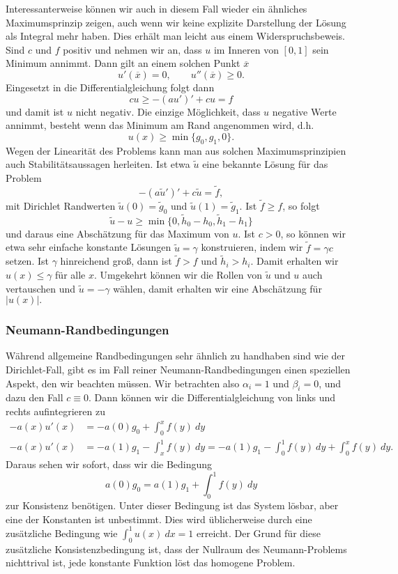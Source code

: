 Interessanterweise k\"onnen wir auch in diesem Fall wieder ein ähnliches Maximumsprinzip zeigen, auch wenn wir keine explizite Darstellung der Lösung als Integral mehr haben. Dies erh\"alt man leicht aus einem Widerspruchsbeweis. Sind $c$ und $f$ positiv und nehmen wir an, dass $u$ im Inneren von $[0,1]$ sein Minimum annimmt. Dann gilt an einem solchen Punkt $\overline{x}$
$$ u'(\overline{x}) = 0, \qquad u''(\overline{x}) \geq 0 . $$
Eingesetzt in die Differentialgleichung folgt dann 
$$ cu \geq -(au')' + cu = f   $$ 
und damit ist $u$ nicht negativ. Die einzige M\"oglichkeit, dass $u$ negative Werte annimmt, besteht wenn das Minimum am Rand angenommen wird, d.h. 
$$ u(x) \geq \min\{g_0,g_1,0\} . $$ 
Wegen der Linearit\"at des Problems kann man aus solchen Maximumsprinzipien auch Stabilitätsaussagen herleiten. Ist etwa $\tilde u$ eine bekannte L\"osung f\"ur das Problem 
$$ -(a \tilde u')' + c \tilde u = \tilde f, $$
mit Dirichlet Randwerten $\tilde u(0) = \tilde{g}_0$ und $\tilde u(1) = \tilde{g}_1$. Ist $\tilde f \geq f$, so folgt 
$$ \tilde u - u \geq \min\{0,\tilde{h}_0 - h_0, \tilde{h}_1 - h_1 \} $$
und daraus eine Absch\"atzung f\"ur das Maximum von $u$. Ist $c > 0$, so k\"onnen wir etwa sehr einfache konstante L\"osungen $\tilde u = \gamma$ konstruieren, indem wir $\tilde f = \gamma c$ setzen. Ist $\gamma$ hinreichend gro{\ss}, dann ist $\tilde f > f$ und $\tilde{h}_i > h_i$. Damit erhalten wir $u(x) \leq \gamma$ f\"ur alle $x$. Umgekehrt k\"onnen wir die Rollen von $\tilde u$ und $u$ auch vertauschen und $\tilde u = -\gamma$ w\"ahlen, damit erhalten wir eine Absch\"atzung f\"ur $\vert u (x) \vert.$ 

\subsubsection*{Neumann-Randbedingungen}

W\"ahrend allgemeine Randbedingungen sehr \"ahnlich zu handhaben sind wie der Dirichlet-Fall, gibt es im Fall reiner Neumann-Randbedingungen einen speziellen Aspekt, den wir beachten m\"ussen. Wir betrachten also $\alpha_i =1$ und $\beta_i =0$, und dazu den Fall $c \equiv 0$. Dann 
k\"onnen wir die Differentialgleichung von links und rechts aufintegrieren zu
\begin{align*}
	- a(x) u'(x) &= - a(0) g_0 + \int_0^x f(y) ~dy \\
	- a(x) u'(x) &= - a(1) g_1 - \int_x^1 f(y) ~dy  = - a(1) g_1 - \int_0^1 f(y) ~dy +   \int_0^x f(y) ~dy.
\end{align*}
Daraus sehen wir sofort, dass wir die Bedingung
$$ a(0) g_0 =  a(1) g_1 + \int_0^1 f(y) ~dy $$
zur Konsistenz ben\"otigen. Unter dieser Bedingung ist das System l\"osbar, aber eine der Konstanten ist unbestimmt. Dies wird \"ublicherweise durch eine zus\"atzliche Bedingung wie $\int_0^1 u(x)~dx =1$ erreicht. Der Grund f\"ur diese zus\"atzliche Konsistenzbedingung ist, dass der Nullraum des Neumann-Problems nichttrival ist, jede konstante Funktion l\"ost das homogene Problem. 


